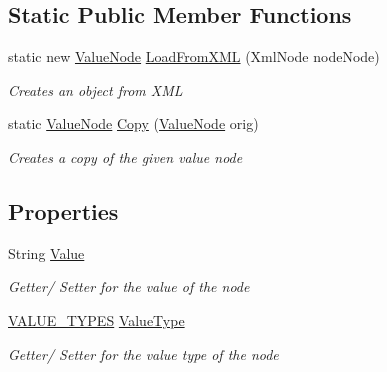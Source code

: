 \subsection*{Static Public Member Functions}
\begin{DoxyCompactItemize}
\item 
static new \hyperlink{class_web_analyzer_1_1_models_1_1_settings_model_1_1_expression_tree_1_1_value_node}{Value\+Node} \hyperlink{class_web_analyzer_1_1_models_1_1_settings_model_1_1_expression_tree_1_1_value_node_adb68b0f5d8d1c99e3abca965f48a67d0}{Load\+From\+X\+M\+L} (Xml\+Node node\+Node)
\begin{DoxyCompactList}\small\item\em Creates an object from X\+M\+L \end{DoxyCompactList}\item 
static \hyperlink{class_web_analyzer_1_1_models_1_1_settings_model_1_1_expression_tree_1_1_value_node}{Value\+Node} \hyperlink{class_web_analyzer_1_1_models_1_1_settings_model_1_1_expression_tree_1_1_value_node_ab8b25f08e20250c49c14f7dfeda7a96f}{Copy} (\hyperlink{class_web_analyzer_1_1_models_1_1_settings_model_1_1_expression_tree_1_1_value_node}{Value\+Node} orig)
\begin{DoxyCompactList}\small\item\em Creates a copy of the given value node \end{DoxyCompactList}\end{DoxyCompactItemize}
\subsection*{Properties}
\begin{DoxyCompactItemize}
\item 
String \hyperlink{class_web_analyzer_1_1_models_1_1_settings_model_1_1_expression_tree_1_1_value_node_abc4f8ff5dd972ce1c49f135273797926}{Value}
\begin{DoxyCompactList}\small\item\em Getter/ Setter for the value of the node \end{DoxyCompactList}\item 
\hyperlink{class_web_analyzer_1_1_models_1_1_settings_model_1_1_expression_tree_1_1_value_node_ac18254d82bd6e0d754ed1a2484882d11}{V\+A\+L\+U\+E\+\_\+\+T\+Y\+P\+E\+S} \hyperlink{class_web_analyzer_1_1_models_1_1_settings_model_1_1_expression_tree_1_1_value_node_aa1c55c593ae80ac78221c1397ede5ab2}{Value\+Type}
\begin{DoxyCompactList}\small\item\em Getter/ Setter for the value type of the node \end{DoxyCompactList}\end{DoxyCompactItemize}
